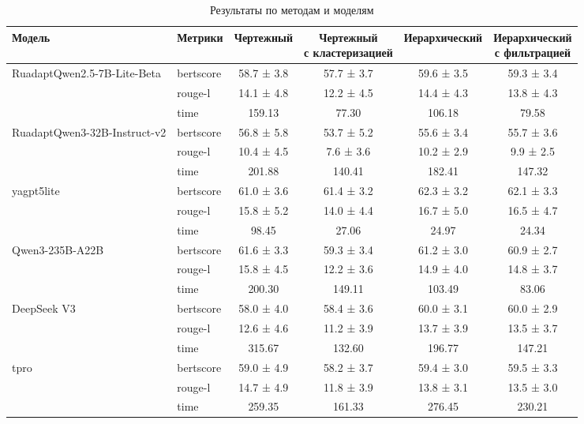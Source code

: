 \documentclass{article}
\theoremstyle{definition}
\theoremstyle{plain}
\begin{document}
\begin{table}[ht]
\centering
\small                       %
\setlength{\tabcolsep}{4pt}  %

\caption{Результаты по методам и моделям}
\label{tab:results_models}

\begin{tabular}{llcccc}      %
\toprule
Модель & Метрики & Чертежный & \shortstack{Чертежный\\с кластеризацией} & Иерархический & \shortstack{Иерархический\\с фильтрацией} \\
\midrule
\multirow{2}{*}{RuadaptQwen2.5-7B-Lite-Beta}
 & bertscore & 58.7 ± 3.8 & 57.7 ± 3.7 & 59.6 ± 3.5 & 59.3 ± 3.4 \\
 & rouge-l & 14.1 ± 4.8 & 12.2 ± 4.5 & 14.4 ± 4.3 & 13.8 ± 4.3 \\
 & time & 159.13 & 77.30 & 106.18 & 79.58 \\
\midrule
\multirow{2}{*}{RuadaptQwen3-32B-Instruct-v2}
& bertscore & 56.8 ± 5.8 & 53.7 ± 5.2 & 55.6 ± 3.4 & 55.7 ± 3.6 \\
& rouge-l   & 10.4 ± 4.5 & 7.6 ± 3.6 & 10.2 ± 2.9 & 9.9 ± 2.5 \\
& time & 201.88 & 140.41 & 182.41 & 147.32 \\
\midrule
\multirow{2}{*}{yagpt5lite}
 & bertscore & 61.0 ± 3.6 & 61.4 ± 3.2 & 62.3 ± 3.2 & 62.1 ± 3.3 \\
 & rouge-l & 15.8 ± 5.2 & 14.0 ± 4.4 & 16.7 ± 5.0 & 16.5 ± 4.7 \\
 & time & 98.45 & 27.06 & 24.97 & 24.34 \\
\midrule
\multirow{2}{*}{Qwen3-235B-A22B}
 & bertscore & 61.6 ± 3.3 & 59.3 ± 3.4 & 61.2 ± 3.0 & 60.9 ± 2.7 \\
 & rouge-l & 15.8 ± 4.5 & 12.2 ± 3.6 & 14.9 ± 4.0 & 14.8 ± 3.7 \\
 & time & 200.30 & 149.11 & 103.49 & 83.06 \\
\midrule
\multirow{2}{*}{DeepSeek V3}
 & bertscore & 58.0 ± 4.0 & 58.4 ± 3.6 & 60.0 ± 3.1 & 60.0 ± 2.9 \\
 & rouge-l & 12.6 ± 4.6 & 11.2 ± 3.9 & 13.7 ± 3.9 & 13.5 ± 3.7 \\
 & time & 315.67 & 132.60 & 196.77 & 147.21 \\
\midrule
\multirow{2}{*}{tpro}
 & bertscore & 59.0 ± 4.9 & 58.2 ± 3.7 & 59.4 ± 3.0 & 59.5 ± 3.3 \\
 & rouge-l & 14.7 ± 4.9 & 11.8 ± 3.9 & 13.8 ± 3.1 & 13.5 ± 3.0 \\
 & time & 259.35 & 161.33 & 276.45 & 230.21 \\ 
\bottomrule
\end{tabular}
\end{table}
\end{document}
